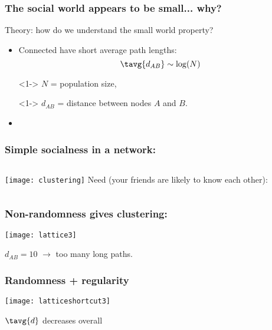 \begin{frame}
  \frametitle{The social world appears to be small...  why?}
  
  \begin{block}{Theory: how do we understand the small world property?}
    \begin{itemize}
    \item<1->
      Connected 
      have short average path lengths:
      $$\tavg{d_{AB}} \sim \log(N)$$
    \item[]<1->
      $N$ = population size,
    \item[]<1->
      $d_{AB}$ = distance between nodes $A$ and $B$.
    \item<2->
    \end{itemize}
  \end{block}

\end{frame}




\begin{frame}
  \frametitle{Simple socialness in a network:}

  \begin{columns}
    \texttt{[image: clustering]}
    Need  (your friends are likely to know each other):
  \end{columns}

\end{frame}


\begin{frame}
  \frametitle{Non-randomness gives clustering:}

  \begin{center}
    \texttt{[image: lattice3]}
  \end{center}

  $d_{AB}=10$ $\rightarrow$ too many long paths.

\end{frame}

\begin{frame}
  \frametitle{Randomness + regularity}

  \begin{center}
    \texttt{[image: latticeshortcut3]}
  \end{center}

  \hfill $\tavg{d}$ decreases overall
\end{frame}

